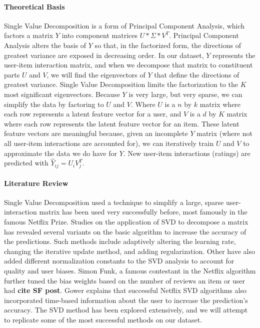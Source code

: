 \documentclass[12pt]{article}
\begin{document}
\paragraph{Theoretical Basis} Single Value Decomposition is a form of Principal Component Analysis, which factors a matrix $Y$ into component matrices $U * \Sigma * V^{T}$. Principal Component Analysis alters the basis of $Y$ so that, in the factorized form, the directions of greatest variance are exposed in decreasing order. In our dataset, $Y$ represents the user-item interaction matrix, and when we decompose that matrix to constituent parts $U$ and $V$, we will find the eigenvectors of $Y$ that define the directions of greatest variance. Single Value Decomposition limits the factorization to the $K$ most significant eigenvectors. Because $Y$ is very large, but very sparse, we can simplify the data by factoring to $U$ and $V$. Where $U$ is a $n$ by $k$ matrix where each row represents a latent feature vector for a user, and $V$ is a $d$ by $K$ matrix where each row represents the latent feature vector for an item. These latent feature vectors are meaningful because, given an incomplete $Y$ matrix (where not all user-item interactions are accounted for), we can iteratively train $U$ and $V$ to approximate the data we do have for $Y$. New user-item interactions (ratings) are predicted with $\hat{Y}_{ij} = U_{i}V_{j}^{T}$.

\paragraph{Literature Review} Single Value Decomposition used a technique to simplify a large, sparse user-interaction matrix has been used very successfully before, most famously in the famous Netflix Prize\textsuperscript{\cite{gower}}. Studies on the application of SVD to decompose a matrix has revealed several variants on the basic algorithm to increase the accuracy of the predictions. Such methods include adaptively altering the learning rate, changing the iterative update method, and adding regularization\textsuperscript{\cite{ma}}. Other have also added different normalization constants to the SVD analysis to account for quality and user biases\textsuperscript{\cite{paterek}}. Simon Funk, a famous contestant in the Netflix algorithm further tuned the bias weights based on the number of reviews an item or user had \textbf{cite SF post}. Gower explains that successful Netflix SVD algorithms also incorporated time-based information about the user to increase the prediction's accuracy\textsuperscript{\cite{gower}}. The SVD method has been explored extensively, and we will attempt to replicate some of the most successful methods on our dataset.
\end{document}
